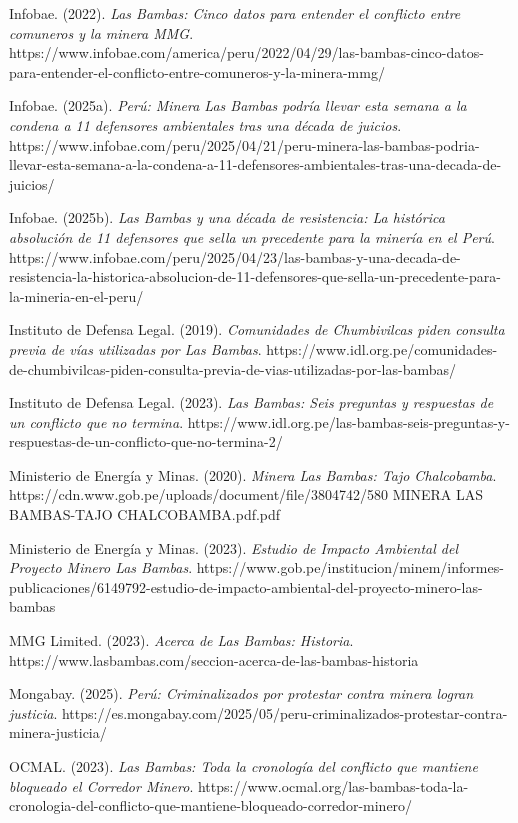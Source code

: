 \documentclass[
  stu,
  floatsintext,
  longtable,
  a4paper,
  nolmodern,
  notxfonts,
  notimes,
  colorlinks=true,linkcolor=blue,citecolor=blue,urlcolor=blue]{apa7}
\begin{document}
Infobae. (2022). \emph{Las Bambas: Cinco datos para entender el
conflicto entre comuneros y la minera MMG}.
https://www.infobae.com/america/peru/2022/04/29/las-bambas-cinco-datos-para-entender-el-conflicto-entre-comuneros-y-la-minera-mmg/

Infobae. (2025a). \emph{Perú: Minera Las Bambas podría llevar esta
semana a la condena a 11 defensores ambientales tras una década de
juicios}.
https://www.infobae.com/peru/2025/04/21/peru-minera-las-bambas-podria-llevar-esta-semana-a-la-condena-a-11-defensores-ambientales-tras-una-decada-de-juicios/

Infobae. (2025b). \emph{Las Bambas y una década de resistencia: La
histórica absolución de 11 defensores que sella un precedente para la
minería en el Perú}.
https://www.infobae.com/peru/2025/04/23/las-bambas-y-una-decada-de-resistencia-la-historica-absolucion-de-11-defensores-que-sella-un-precedente-para-la-mineria-en-el-peru/

Instituto de Defensa Legal. (2019). \emph{Comunidades de Chumbivilcas
piden consulta previa de vías utilizadas por Las Bambas}.
https://www.idl.org.pe/comunidades-de-chumbivilcas-piden-consulta-previa-de-vias-utilizadas-por-las-bambas/

Instituto de Defensa Legal. (2023). \emph{Las Bambas: Seis preguntas y
respuestas de un conflicto que no termina}.
https://www.idl.org.pe/las-bambas-seis-preguntas-y-respuestas-de-un-conflicto-que-no-termina-2/

Ministerio de Energía y Minas. (2020). \emph{Minera Las Bambas: Tajo
Chalcobamba}. https://cdn.www.gob.pe/uploads/document/file/3804742/580
MINERA LAS BAMBAS-TAJO CHALCOBAMBA.pdf.pdf

Ministerio de Energía y Minas. (2023). \emph{Estudio de Impacto
Ambiental del Proyecto Minero Las Bambas}.
https://www.gob.pe/institucion/minem/informes-publicaciones/6149792-estudio-de-impacto-ambiental-del-proyecto-minero-las-bambas

MMG Limited. (2023). \emph{Acerca de Las Bambas: Historia}.
https://www.lasbambas.com/seccion-acerca-de-las-bambas-historia

Mongabay. (2025). \emph{Perú: Criminalizados por protestar contra minera
logran justicia}.
https://es.mongabay.com/2025/05/peru-criminalizados-protestar-contra-minera-justicia/

OCMAL. (2023). \emph{Las Bambas: Toda la cronología del conflicto que
mantiene bloqueado el Corredor Minero}.
https://www.ocmal.org/las-bambas-toda-la-cronologia-del-conflicto-que-mantiene-bloqueado-corredor-minero/
\end{document}
